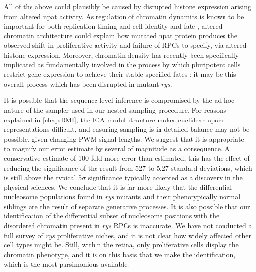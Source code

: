 All of the above could plausibly be caused by disrupted histone expression arising from altered npat activity. As regulation of chromatin dynamics is known to be important for both replication timing \cite{Gilbert2010} and cell identity and fate \cite{Serrano2013}, altered chromatin architecture could explain how mutated npat protein produces the observed shift in proliferative activity and failure of RPCs to specify, via altered histone expression. Moreover, chromatin density has recently been specifically implicated as fundamentally involved in the process by which pluripotent cells restrict gene expression to achieve their stable specified fates \cite{Golkaram2017}; it may be this overall process which has been disrupted in mutant \textit{rys}.

It is possible that the sequence-level inference is compromised by the ad-hoc nature of the sampler used in our nested sampling procedure. For reasons explained in \autoref{chap:BMI}, the ICA model structure makes euclidean space representations difficult, and ensuring sampling is in detailed balance may not be possible, given changing PWM signal lengths. We suggest that it is appropriate to magnify our error estimate by several of magnitude as a consequence. A conservative estimate of 100-fold more error than estimated, this has the effect of reducing the significance of the result from 527 to 5.27 standard deviations, which is still above the typical 5$\sigma$ significance typically accepted as a discovery in the physical sciences. We conclude that it is far more likely that the differential nucleosome populations found in \textit{rys} mutants and their phenotypically normal siblings are the result of separate generative processes. It is also possible that our identification of the differential subset of nucleosome positions with the disordered chromatin present in \textit{rys} RPCs is inaccurate. We have not conducted a full survey of \textit{rys} proliferative niches, and it is not clear how widely affected other cell types might be. Still, within the retina, only proliferative cells display the chromatin phenotype, and it is on this basis that we make the identification, which is the most parsimonious available. 

